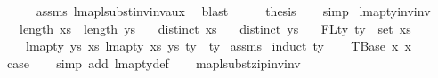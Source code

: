 \begin{isabellebody}
\ \ \ \ \isamarkupfalse%
\ assms{\isacharparenleft}{\kern0pt}{}{\isacharcomma}{\kern0pt}{}{\isacharparenright}{\kern0pt}\ lmap{\isacharunderscore}{\kern0pt}lsubst{\isacharunderscore}{\kern0pt}inv{\isacharunderscore}{\kern0pt}inv{\isacharunderscore}{\kern0pt}aux\ \isamarkupfalse%
\ blast\isanewline
\ \ \isamarkupfalse%
\ \isamarkupfalse%
\ {\isacharquery}{\kern0pt}thesis\isanewline
\ \ \isamarkupfalse%
\ simp\isanewline
{}\isamarkupfalse%
%
\endisatagproof
{\isafoldproof}%
%
\isadelimproof
%
\endisadelimproof
%
\isadelimdocument
%
\endisadelimdocument
%
\isatagdocument
%
\isamarkuptrue%
%
\endisatagdocument
{\isafolddocument}%
%
\isadelimdocument
%
\endisadelimdocument
{}\isamarkupfalse%
\ lmap{\isacharunderscore}{\kern0pt}ty{\isacharunderscore}{\kern0pt}inv{\isacharunderscore}{\kern0pt}inv{\isacharcolon}{\kern0pt}\isanewline
\ \ \ {\isachardoublequoteopen}length\ xs\ {\isacharequal}{\kern0pt}\ length\ ys{\isachardoublequoteclose}\isanewline
\ \ \ {\isachardoublequoteopen}distinct\ xs{\isachardoublequoteclose}\isanewline
\ \ \ {\isachardoublequoteopen}distinct\ ys{\isachardoublequoteclose}\isanewline
\ \ \ {\isachardoublequoteopen}FLty\ ty\ {\isasymsubseteq}\ set\ xs{\isachardoublequoteclose}\isanewline
\ \ \ \ {\isachardoublequoteopen}lmap{\isacharunderscore}{\kern0pt}ty\ ys\ xs\ {\isacharparenleft}{\kern0pt}lmap{\isacharunderscore}{\kern0pt}ty\ xs\ ys\ ty{\isacharparenright}{\kern0pt}\ {\isacharequal}{\kern0pt}\ ty{\isachardoublequoteclose}\isanewline
%
\isadelimproof
%
\endisadelimproof
%
\isatagproof
{}\isamarkupfalse%
\ assms\isanewline
{}\isamarkupfalse%
\ {\isacharparenleft}{\kern0pt}induct\ ty{\isacharparenright}{\kern0pt}\isanewline
\ \ \isamarkupfalse%
\ {\isacharparenleft}{\kern0pt}TBase\ x{}\ x{}{\isacharparenright}{\kern0pt}\isanewline
\ \ \isamarkupfalse%
\ \isamarkupfalse%
\ {\isacharquery}{\kern0pt}case\isanewline
\ \ \isamarkupfalse%
\ {\isacharparenleft}{\kern0pt}simp\ add{\isacharcolon}{\kern0pt}\ lmap{\isacharunderscore}{\kern0pt}ty{\isacharunderscore}{\kern0pt}def{\isacharparenright}{\kern0pt}\isanewline
\ \ \isamarkupfalse%
\ map{\isacharunderscore}{\kern0pt}lsubst{\isacharunderscore}{\kern0pt}zip{\isacharunderscore}{\kern0pt}inv{\isacharunderscore}{\kern0pt}inv\ \isamarkupfalse%

\end{isabellebody}
